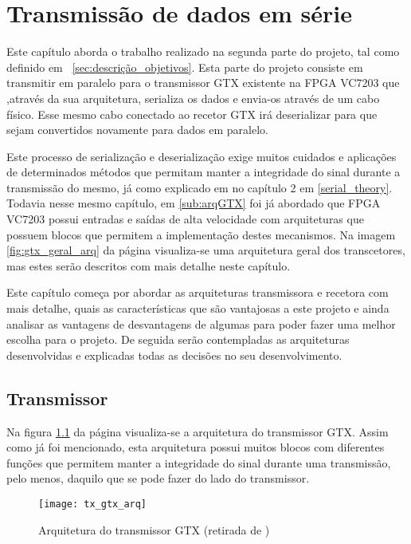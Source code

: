 
\chapter{Transmissão de dados em série}\label{chap:chap4}

Este capítulo aborda o trabalho realizado na segunda parte do projeto, tal como definido em ~\ref{sec:descrição_objetivos}. Esta parte do projeto consiste em transmitir em paralelo para o transmissor GTX existente na FPGA VC7203 que ,através da sua arquitetura, serializa os dados e envia-os através de um cabo físico. Esse mesmo cabo conectado ao recetor GTX irá deserializar para que sejam convertidos novamente para dados em paralelo.

Este processo de serialização e deserialização exige muitos cuidados e aplicações de determinados métodos que permitam manter a integridade do sinal durante a transmissão do mesmo, já como explicado em no capítulo 2 em \ref{serial_theory}. Todavia nesse mesmo capítulo, em \ref{sub:arqGTX} foi já abordado que FPGA VC7203 possui entradas e saídas de alta velocidade com arquiteturas que possuem blocos que permitem a implementação destes mecanismos. Na imagem \ref{fig:gtx_geral_arq} da página \pageref{fig:gtx_geral_arq} visualiza-se uma arquitetura geral dos transcetores, mas estes serão descritos com mais detalhe neste capítulo.

Este capítulo começa por abordar as arquiteturas transmissora e recetora com mais detalhe, quais as características que são vantajosas a este projeto e ainda analisar as vantagens de desvantagens de algumas para poder fazer uma melhor escolha para o projeto. De seguida serão contempladas as arquiteturas desenvolvidas e explicadas todas as decisões no seu desenvolvimento.

\section{Transmissor} \label{sec:tx_gtx}

Na figura \ref{fig:gtx_tx_arq} da página \pageref{fig:gtx_tx_arq} visualiza-se a arquitetura do transmissor GTX. Assim como já foi mencionado, esta arquitetura possui muitos blocos com diferentes funções que permitem manter a integridade do sinal durante uma transmissão, pelo menos, daquilo que se pode fazer do lado do transmissor.
\begin{figure}[h!]
	\begin{center}
		\leavevmode
		\texttt{[image: tx\_gtx\_arq]}
		\caption[Arquitetura do transmissor GTX]{Arquitetura do transmissor GTX (retirada de \cite{R011})}
		\label{fig:gtx_tx_arq}
	\end{center}
\end{figure}

